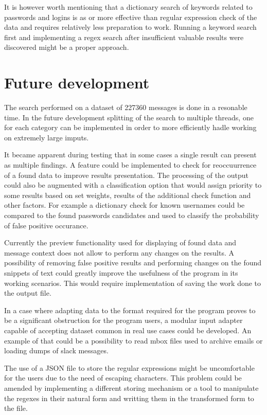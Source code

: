 \documentclass[a4paper,twoside,12pt]{book}
\begin{document}
It is however worth mentioning that a dictionary search of keywords related to passwords and
logins is as or more effective than regular expression check of the data and requires relatively
less preparation to work. Running a keyword search first and implementing a regex search after 
insufficient valuable results were discovered might be a proper approach.

\section{Future development}

The search performed on a dataset of 227360 messages is done in a resonable time. In the future development
splitting of the search to multiple threads, one for each category can be implemented in order to more efficiently
hadle working on extremely large imputs. 

It became apparent during testing that in some cases a single result can present as multiple findings. 
A feature could be implemented to check for reoccuurrence of a found data to improve
results presentation. The processing of the output could also be augmented with a classification
option that would assign priority to some results based on set weights, results of the additional
check function and other factors. For example a dictionary check for known usernames could be compared to
the found passwords candidates and used to classify the probability of false positive occurance. 


Currently the preview functionality used for displaying of found data and message context 
does not allow to perform any changes on the results. A possibility of removing false positive 
results and performing changes on the found snippets of text could greatly improve the 
usefulness of the program in its working scenarios. This would require implementation of saving the work
done to the output file.

In a case where adapting data to the format required for the program proves to be a significant 
obstruction for the program users, a modular input adapter capable of accepting dataset common in 
real use cases could be developed. An example of that could be a possibility to read mbox files 
used to archive emails or loading dumps of slack messages.

The use of a JSON file to store the regular expressions might be uncomfortable for the users due to the need of escaping characters. 
This problem could be amended by implementing a different storing mechanism or a tool to manipulate the regexes in their natural form 
and writting them in the transformed form to the file. 
\end{document}
